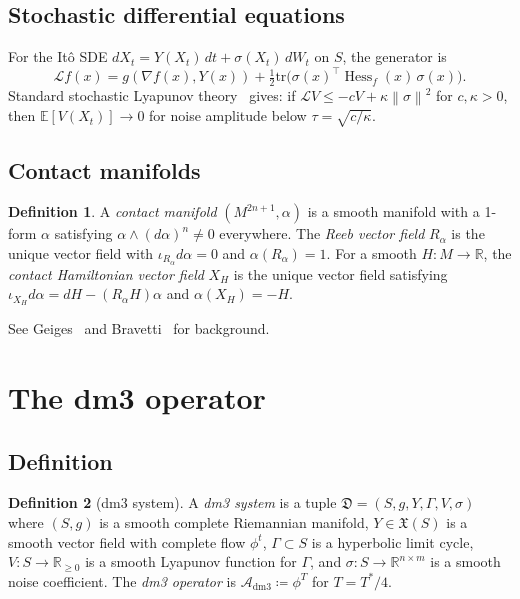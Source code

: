 \documentclass[12pt, oneside]{book}
\theoremstyle{plain}
\theoremstyle{definition}
\newtheorem{definition}{Definition}[section]
\theoremstyle{remark}
\newcommand{\R}{\mathbb{R}}
\newcommand{\dm}{\mathfrak{D}}
\newcommand{\Orb}{\Gamma}
\newcommand{\cL}{\mathcal{L}}
\newcommand{\norm}[1]{\left\|#1\right\|}
\DeclareMathOperator{\Hess}{Hess}
\begin{document}
\subsection{Stochastic differential equations}

For the It\^o SDE $dX_t=Y(X_t)\,dt+\sigma(X_t)\,dW_t$ on $S$,
the generator is
\[
  \cL f(x) = g(\nabla f(x),Y(x))
             + \tfrac12\mathrm{tr}\bigl(\sigma(x)^\top\Hess_f(x)\,\sigma(x)\bigr).
\]
Standard stochastic Lyapunov theory~\cite{Hasminski} gives: if
$\cL V\le -cV+\kappa\norm\sigma^2$ for $c,\kappa>0$, then
$\mathbb{E}[V(X_t)]\to 0$ for noise amplitude below $\tau=\sqrt{c/\kappa}$.

\subsection{Contact manifolds}

\begin{definition}\label{def:contact}
A \emph{contact manifold} $(M^{2n+1},\alpha)$ is a smooth manifold
with a 1-form $\alpha$ satisfying $\alpha\wedge(d\alpha)^n\ne 0$
everywhere. The \emph{Reeb vector field} $R_\alpha$ is the unique
vector field with $\iota_{R_\alpha}d\alpha=0$ and $\alpha(R_\alpha)=1$.
For a smooth $H\colon M\to\R$, the \emph{contact Hamiltonian vector
field} $X_H$ is the unique vector field satisfying
$\iota_{X_H}d\alpha=dH-(R_\alpha H)\alpha$ and $\alpha(X_H)=-H$.
\end{definition}

See Geiges~\cite{Geiges} and Bravetti~\cite{Bravetti2017} for background.

\section{The dm3 operator}\label{sec:dm3}

\subsection{Definition}

\begin{definition}[dm3 system]\label{def:dm3}
A \emph{dm3 system} is a tuple $\dm=(S,g,Y,\Orb,V,\sigma)$ where
$(S,g)$ is a smooth complete Riemannian manifold, $Y\in\mathfrak{X}(S)$
is a smooth vector field with complete flow $\phi^t$, $\Orb\subset S$
is a hyperbolic limit cycle, $V\colon S\to\R_{\ge 0}$ is a smooth
Lyapunov function for $\Orb$, and $\sigma\colon S\to\R^{n\times m}$
is a smooth noise coefficient. The \emph{dm3 operator} is
$\mathcal{A}_{\mathrm{dm3}}\coloneqq\phi^T$ for $T=T^*/4$.
\end{definition}
\end{document}
